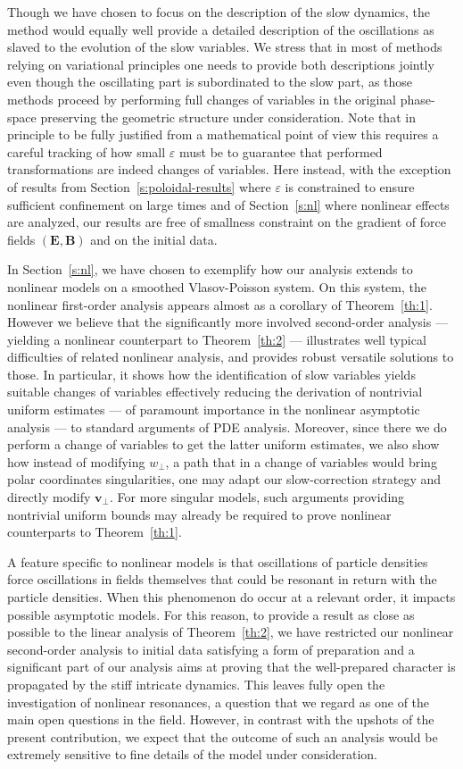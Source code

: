 \documentclass[JEP,XML,SOM,Unicode]{cedram}
\newcommand{\sperp}{{\scriptscriptstyle\perp}}
\let\eps\varepsilon
\theoremstyle{plain}
\theoremstyle{definition}
\newcommand\bB{{\boldsymbol B}}
\newcommand\bE{{\boldsymbol E}}
\newcommand\bfv{{\boldsymbol v}}
\newcommand\bvperp{\bfv_{\!\sperp}}
\newcommand\eperp{w_{\!\sperp}}
\begin{document}
Though we have chosen to focus on the description of the slow
dynamics, the method would equally well provide a detailed description
of the oscillations as slaved to the evolution of the slow
variables. We stress that in most of methods relying on variational
principles one needs to provide both descriptions jointly even though
the oscillating part is subordinated to the slow part, as those
methods proceed by performing full changes of variables in the
original phase-space preserving the geometric structure under
consideration. Note that in principle to be fully justified from a
mathematical point of view this requires a careful tracking of how
small $\eps$ must be to guarantee that performed transformations are
indeed changes of variables. Here instead, with the exception of
results from Section~\ref{s:poloidal-results} where $\eps$ is
constrained to ensure sufficient confinement on large times and of Section~\ref{s:nl} where nonlinear effects are analyzed, our
results are free of smallness constraint on the gradient of force
fields $(\bE,\bB)$ and on the initial data.

In Section~\ref{s:nl}, we have chosen to exemplify how our analysis extends to nonlinear models on a smoothed Vlasov-Poisson system. On this system, the nonlinear first-order analysis appears almost as a corollary of Theorem~\ref{th:1}. However we believe that the significantly more involved second-order analysis --- yielding a nonlinear counterpart to Theorem~\ref{th:2} --- illustrates well typical difficulties of related nonlinear analysis, and provides robust versatile solutions to those. In particular, it shows how the identification of slow variables yields suitable changes of variables effectively reducing the derivation of nontrivial uniform estimates --- of paramount importance in the nonlinear asymptotic analysis --- to standard arguments of PDE analysis. Moreover, since there we do perform a change of variables to get the latter uniform estimates, we also show how instead of modifying $\eperp$, a path that in a change of variables would bring \hbox{polar} coordinates singularities, one may adapt our slow-correction strategy and directly modify $\bvperp$. For more singular models, such arguments providing nontrivial uniform bounds may already be required to prove nonlinear counterparts to Theorem~\ref{th:1}.

A feature specific to nonlinear models is that oscillations of particle densities force oscillations in fields themselves that could be resonant in return with the particle densities. When this phenomenon do occur at a relevant order, it impacts possible asymptotic models. For this reason, to provide a result as close as possible to the linear analysis of Theorem~\ref{th:2}, we have restricted our nonlinear second-order analysis to initial data satisfying a form of preparation and a significant part of our analysis aims at proving that the well-prepared character is propagated by the stiff intricate dynamics. This leaves fully open the investigation of nonlinear resonances, a question that we regard as one of the main open questions in the field. However, in contrast with the upshots of the present contribution, we expect that the outcome of such an analysis would be extremely sensitive to fine details of the model under consideration.
\end{document}
